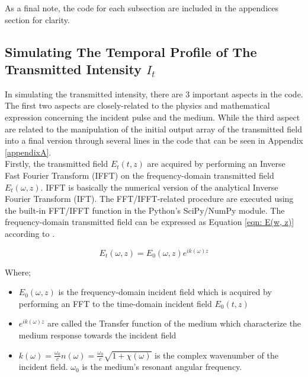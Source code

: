 As a final note, the code for each subsection are included in the appendices section for clarity.

\subsection{Simulating The Temporal Profile of The Transmitted Intensity $I_{t}$}\label{temporalProfile}
In simulating the transmitted intensity, there are 3 important aspects in the code. The first two aspects are closely-related to the physics and mathematical expression concerning the incident pulse and the medium. While the third aspect are related to the manipulation of the initial output array of the transmitted field into a final version through several lines in the code that can be seen in Appendix \ref{appendixA}.\\

Firstly, the transmitted field $E_{t}(t, z)$ are acquired by performing an Inverse Fast Fourier Transform (IFFT) on the frequency-domain transmitted field $E_{t}(\omega, z)$. IFFT is basically the numerical version of the analytical Inverse Fourier Transform (IFT). The FFT/IFFT-related procedure are executed using the built-in FFT/IFFT function in the Python's SciPy/NumPy module. The frequency-domain transmitted field can be expressed as Equation \ref{eqn: E(w, z)} according to \cite{jeong2006thesis}.

\begin{equation}
    E_{t}(\omega, z) = E_{0}(\omega, z) e^{i k(\omega) z}
    \label{eqn: E(w, z)}
\end{equation}

Where;

\begin{itemize}
    \item $E_{0}(\omega, z)$ is the frequency-domain incident field which is acquired by performing an FFT to the time-domain incident field $E_{0}(t, z)$
    \item $e^{i k(\omega) z}$ are called the Transfer function of the medium which characterize the medium response towards the incident field
    \item $k(\omega) = \frac{\omega_{0}}{c} n(\omega) = \frac{\omega_{0}}{c} \sqrt{1 + \chi(\omega)}$ is the complex wavenumber of the incident field. $\omega_{0}$ is the medium's resonant angular frequency.
\end{itemize}

